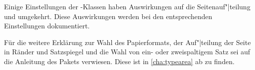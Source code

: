 Einige Einstellungen der \KOMAScript{}-Klassen haben Auswirkungen auf die
Seitenauf"|teilung und umgekehrt. Diese Auswirkungen werden bei den
entsprechenden Einstellungen dokumentiert.

Für die weitere Erklärung zur Wahl des Papierformats, der Auf"|teilung der
Seite in Ränder und Satzspiegel und die Wahl von ein- oder zweispaltigem Satz
sei auf die Anleitung des Pakets
\hyperref[cha:typearea]{}
verwiesen. Diese ist in \autoref{cha:typearea} ab 
zu finden.

